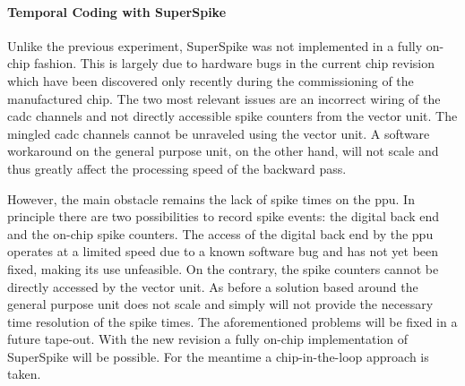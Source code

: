 \paragraph{Temporal Coding with SuperSpike} Unlike the previous experiment, SuperSpike was not implemented in a fully on-chip fashion. This is largely due to hardware bugs in the current chip revision which have been discovered only recently during the commissioning of the manufactured chip. The two most relevant issues are an incorrect wiring of the \gls{cadc} channels and not directly accessible spike counters from the vector unit. The mingled \gls{cadc} channels cannot be unraveled using the vector unit. A software workaround on the general purpose unit, on the other hand, will not scale and thus greatly affect the processing speed of the backward pass.

However, the main obstacle remains the lack of spike times on the \gls{ppu}. In principle there are two possibilities to record spike events: the digital back end and the on-chip spike counters. The access of the digital back end by the \gls{ppu} operates at a limited speed due to a known software bug and has not yet been fixed, making its use unfeasible. On the contrary, the spike counters cannot be directly accessed by the vector unit. As before a solution based around the general purpose unit does not scale and simply will not provide the necessary time resolution of the spike times. The aforementioned problems will be fixed in a future tape-out. With the new revision a fully on-chip implementation of SuperSpike will be possible. For the meantime a chip-in-the-loop approach is taken.

